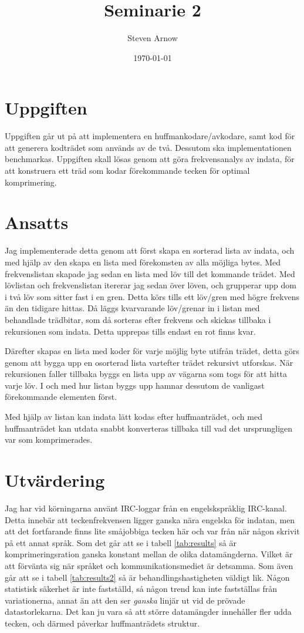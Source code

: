 \documentclass[a4paper, 11pt]{article}
\title{Seminarie 2}
\author{Steven Arnow}
\date{\today}
\begin{document}
\maketitle 

\section{Uppgiften}

Uppgiften går ut på att implementera en huffmankodare/avkodare, samt kod för att generera kodträdet som används av de två. Dessutom ska implementationen benchmarkas. Uppgiften skall lösas genom att göra frekvensanalys av indata, för att konstruera ett träd som kodar förekommande tecken för optimal komprimering. 

\section{Ansatts}

Jag implementerade detta genom att först skapa en sorterad lista av indata, och med hjälp av den skapa en lista med förekomsten av alla möjliga bytes. Med frekvenslistan skapade jag sedan en lista med löv till det kommande trädet. Med lövlistan och frekvenslistan itererar jag sedan över löven, och grupperar upp dom i två löv som sitter fast i en gren. Detta körs tills ett löv/gren med högre frekvens än den tidigare hittas. Då läggs kvarvarande löv/grenar in i listan med behandlade trädbitar, som då sorteras efter frekvens och skickas tillbaka i rekursionen som indata. Detta upprepas tills endast en rot finns kvar.

Därefter skapas en lista med koder för varje möjlig byte utifrån trädet, detta görs genom att bygga upp en osorterad lista vartefter trädet rekursivt utforskas. När rekursionen faller tillbaka byggs en lista upp av vägarna som togs för att hitta varje löv. I och med hur listan byggs upp hamnar dessutom de vanligast förekommande elementen först.

Med hjälp av listan kan indata lätt kodas efter huffmanträdet, och med huffmanträdet kan utdata snabbt konverteras tillbaka till vad det ursprungligen var som komprimerades.

\section{Utvärdering}

Jag har vid körningarna använt IRC-loggar från en engelskspråklig IRC-kanal. Detta innebär att teckenfrekvensen ligger ganska nära engelska för indatan, men att det fortfarande finns lite småjobbiga tecken här och var från när någon skrivit på ett annat språk. Som det går att se i tabell \ref{tab:results} så är komprimeringsration ganska konstant mellan de olika datamängderna. Vilket är att förvänta sig när språket och kommunikationsmediet är detsamma. Som även går att se i tabell \ref{tab:results2} så är behandlingshastigheten väldigt lik. Någon statistisk säkerhet är inte fastställd, så någon trend kan inte fastställas från variationerna, annat än att den ser \emph{ganska} linjär ut vid de prövade datastorlekarna. Det kan ju vara så att större datamängder innehåller fler udda tecken, och därmed påverkar huffmanträdets struktur.
\end{document}
